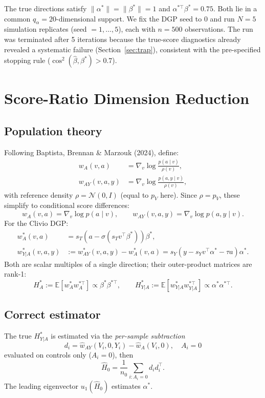 \documentclass[11pt]{article}
\newcommand{\E}{\mathbb{E}}
\begin{document}
The true directions satisfy $\|\alpha^*\|=\|\beta^*\|=1$ and
$\alpha^{*\top}\beta^*=0.75$.  Both lie in a common $q_\alpha=20$-dimensional
support.  We fix the DGP seed to $0$ and run $N=5$ simulation replicates
(seed $=1,\ldots,5$), each with $n=500$ observations.
The run was terminated after 5 iterations because the true-score diagnostics
already revealed a systematic failure (Section~\ref{sec:trap}), consistent
with the pre-specified stopping rule ($\cos^2(\hat\beta,\beta^*)>0.7$).

\section{Score-Ratio Dimension Reduction}

\subsection{Population theory}

Following Baptista, Brennan \& Marzouk (2024), define:
\begin{align}
w_A(v,a) &= \nabla_v \log\frac{p(a\mid v)}{\rho(v)},
  \label{eq:wA}\\
w_{AY}(v,a,y) &= \nabla_v \log\frac{p(a,y\mid v)}{\rho(v)},
  \label{eq:wAY}
\end{align}
with reference density $\rho=\mathcal{N}(0,I)$ (equal to $p_V$ here).
Since $\rho=p_V$, these simplify to conditional score differences:
\[
w_A(v,a) = \nabla_v\log p(a\mid v),\qquad
w_{AY}(v,a,y) = \nabla_v\log p(a,y\mid v).
\]
For the Clivio DGP:
\begin{align*}
w_A^*(v,a) &= s_T\!\left(a-\sigma(s_T v^\top\beta^*)\right)\beta^*,\\
w_{Y|A}^*(v,a,y) &:= w_{AY}^*(v,a,y)-w_A^*(v,a)
  = s_Y\!\left(y-s_Y v^\top\alpha^*-\tau a\right)\alpha^*.
\end{align*}
Both are scalar multiples of a single direction; their outer-product matrices
are rank-1:
\[
H_A^* := \E[w_A^*w_A^{*\top}] \propto \beta^*\beta^{*\top},\qquad
H_{Y|A}^* := \E[w_{Y|A}^*w_{Y|A}^{*\top}] \propto \alpha^*\alpha^{*\top}.
\]

\subsection{Correct estimator}

The true $H_{Y|A}^*$ is estimated via the \emph{per-sample subtraction}
\begin{equation}
d_i = \hat w_{AY}(V_i,0,Y_i) - \hat w_A(V_i,0),\quad A_i=0
\label{eq:di}
\end{equation}
evaluated on controls only ($A_i=0$), then
\begin{equation}
\widehat H_0 = \frac{1}{n_0}\sum_{i:A_i=0} d_i d_i^\top.
\label{eq:H0}
\end{equation}
The leading eigenvector $u_1(\widehat H_0)$ estimates $\alpha^*$.
\end{document}
